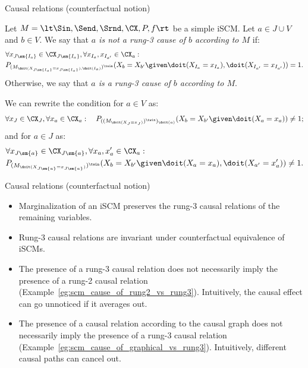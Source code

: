 \begin{frame}{Causal relations (counterfactual notion)}
\begin{Def}[\ref{def:scm_rung3_cause_of}]
  Let $M = \lt \Sin, \Send, \Srnd, \CX, P, f \rt$ be a simple iSCM.
  Let $a \in J \cup V$ and $b \in V$.
  We say that \emph{$a$ is not a rung-3 cause of $b$ according to $M$} if:
    \begin{equation*}\begin{split}
      & \forall x_{J\sm\{I_a\}} \in \CX_{J\sm\{I_a\}}, \forall x_{I_a},x_{I_{a'}} \in \CX_a: \\
      & P_{(M_{\doit(X_{J\sm\{I_a\}}=x_{J\sm\{I_a\}}),\doit(I_a)})^\twin}(X_b = X_{b'} \given \doit(X_{I_a}=x_{I_a}),\doit(X_{I_{a'}}=x_{I_{a'}})) = 1.
    \end{split}\end{equation*}
  Otherwise, we say that \emph{$a$ is a rung-3 cause of $b$ according to $M$}.
\end{Def}
  We can rewrite the condition for $a \in V$ as:
    $$\forall x_J \in \CX_J, \forall x_a \in \CX_a: \quad P_{((M_{\doit(X_J=x_J)})^\twin)_{\doit(a)}}(X_b = X_{b'} \given \doit(X_a=x_a)) \ne 1;$$
  and for $a \in J$ as:
    \begin{equation*}\begin{split}
      &\forall x_{J\sm\{a\}} \in \CX_{J\sm\{a\}}, \forall x_a,x_a' \in \CX_a: \\
      &P_{(M_{\doit(X_{J\sm\{a\}}=x_{J\sm\{a\}})})^\twin}(X_b = X_{b'} \given \doit(X_a=x_a),\doit(X_{a'}=x_a')) \ne 1.
    \end{split}\end{equation*}
\end{frame}

\begin{frame}{Causal relations (counterfactual notion)}
  \begin{itemize}
    \item Marginalization of an iSCM preserves the rung-3 causal relations of the remaining variables.
    \item Rung-3 causal relations are invariant under counterfactual equivalence of iSCMs.
    \item The presence of a rung-3 causal relation does not necessarily imply the presence of a rung-2 causal relation (Example~\ref{eg:scm_cause_of_rung2_vs_rung3}).
    Intuitively, the causal effect can go unnoticed if it averages out.
  \item The presence of a causal relation according to the causal graph does not necessarily imply the presence of a rung-3 causal relation (Example~\ref{eg:scm_cause_of_graphical_vs_rung3}).
Intuitively, different causal paths can cancel out.
  \end{itemize}
\end{frame}

